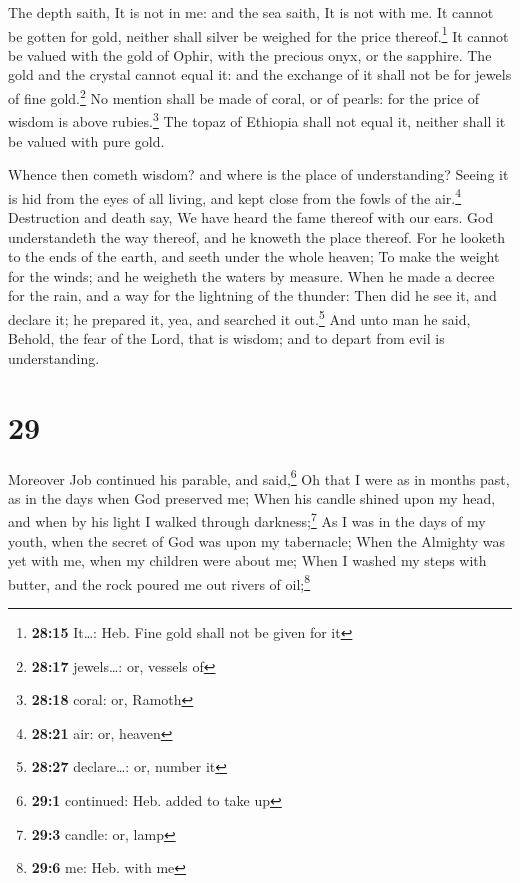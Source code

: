  The depth saith, It is not in me: and the sea saith, It
is not with me.  It cannot be gotten for gold, neither
shall silver be weighed for the price thereof.\footnote{\textbf{28:15}
  It\ldots: Heb. Fine gold shall not be given for it}  It
cannot be valued with the gold of Ophir, with the precious onyx, or the
sapphire.  The gold and the crystal cannot equal it: and
the exchange of it shall not be for jewels of fine gold.\footnote{\textbf{28:17}
  jewels\ldots: or, vessels of}  No mention shall be made
of coral, or of pearls: for the price of wisdom is above
rubies.\footnote{\textbf{28:18} coral: or, Ramoth}  The
topaz of Ethiopia shall not equal it, neither shall it be valued with
pure gold.

 Whence then cometh wisdom? and where is the place of
understanding?  Seeing it is hid from the eyes of all
living, and kept close from the fowls of the air.\footnote{\textbf{28:21}
  air: or, heaven}  Destruction and death say, We have
heard the fame thereof with our ears.  God understandeth
the way thereof, and he knoweth the place thereof.  For
he looketh to the ends of the earth, and seeth under the whole heaven;
 To make the weight for the winds; and he weigheth the
waters by measure.  When he made a decree for the rain,
and a way for the lightning of the thunder:  Then did he
see it, and declare it; he prepared it, yea, and searched it
out.\footnote{\textbf{28:27} declare\ldots: or, number it}
 And unto man he said, Behold, the fear of the Lord, that
is wisdom; and to depart from evil is understanding.

\hypertarget{section-28}{%
\section{29}\label{section-28}}

 Moreover Job continued his parable, and said,\footnote{\textbf{29:1}
  continued: Heb. added to take up}  Oh that I were as in
months past, as in the days when God preserved me;  When
his candle shined upon my head, and when by his light I walked through
darkness;\footnote{\textbf{29:3} candle: or, lamp}  As I
was in the days of my youth, when the secret of God was upon my
tabernacle;  When the Almighty was yet with me, when my
children were about me;  When I washed my steps with
butter, and the rock poured me out rivers of oil;\footnote{\textbf{29:6}
  me: Heb. with me}

